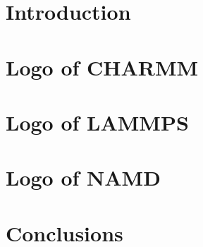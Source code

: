 \documentclass[12pt, twoside]{report}
\begin{document}

\newpage\null\thispagestyle{empty}\newpage




\tableofcontents
{}
\listoffigures
\listoftables
{}



\chapter{Introduction}


\chapter{Logo of CHARMM}


\chapter{Logo of LAMMPS}


\chapter{Logo of NAMD}


\chapter{Conclusions}


{}

\end{document}
